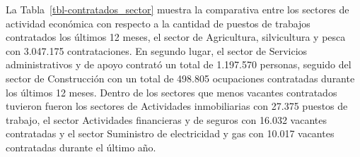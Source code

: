 \documentclass[
  11pt,
]{article}
\begin{document}
\begin{table}

\caption{\label{tbl-contratados_u12}Contratados últimos 12 meses, por
ocupación.}


\end{table}%

\FloatBarrier

La Tabla~\ref{tbl-contratados_sector} muestra la comparativa entre los
sectores de actividad económica con respecto a la cantidad de puestos de
trabajos contratados los últimos 12 meses, el sector de Agricultura,
silvicultura y pesca con 3.047.175 contrataciones. En segundo lugar, el
sector de Servicios administrativos y de apoyo contrató un total de
1.197.570 personas, seguido del sector de Construcción con un total de
498.805 ocupaciones contratadas durante los últimos 12 meses. Dentro de
los sectores que menos vacantes contratados tuvieron fueron los sectores
de Actividades inmobiliarias con 27.375 puestos de trabajo, el sector
Actividades financieras y de seguros con 16.032 vacantes contratadas y
el sector Suministro de electricidad y gas con 10.017 vacantes
contratadas durante el último año.
\end{document}

